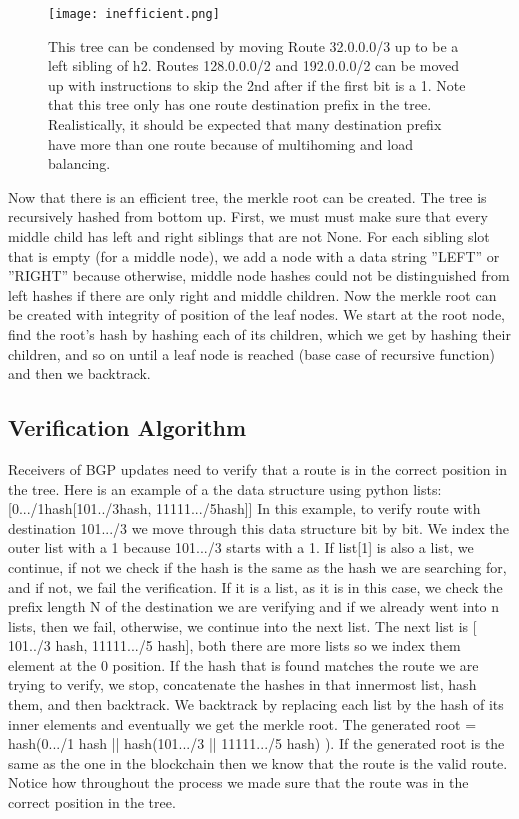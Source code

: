 \documentclass[letterpaper, 10 pt, conference]{ieeeconf}  %
\begin{document}
\begin{figure}[!ht]
	\centering
	\texttt{[image: inefficient.png]}
    \caption{This tree can be condensed by moving Route 32.0.0.0/3 up to be a left sibling of h2. Routes 128.0.0.0/2 and 192.0.0.0/2 can be moved up with instructions to skip the 2nd after if the first bit is a 1. Note that this tree only has one route destination prefix in the tree. Realistically, it should be expected that many destination prefix have more than one route because of multihoming and load balancing.}
    \end{figure}

Now that there is an efficient tree, the merkle root can be created. The tree is recursively hashed from bottom up. First, we must must make sure that every middle child has left and right siblings that are not None. For each sibling slot that is empty (for a middle node), we add a node with a data string ”LEFT” or ”RIGHT” because otherwise, middle node hashes could not be distinguished from left hashes if there are only right and middle children. Now the merkle root can be created with integrity of position of the leaf nodes. We start at the root node, find the root’s hash by hashing each of its children, which we get by hashing their children, and so on until a leaf node is reached (base case of recursive function) and then we backtrack. 

\subsection{Verification Algorithm}

Receivers of BGP updates need to verify that a route is in the correct position in the tree. Here is an example of a the data structure using python lists: [0.../1hash[101../3hash, 11111.../5hash]] In this example, to verify route with destination 101.../3 we move through this data structure bit by bit. We index the outer list with a 1 because 101.../3 starts with a 1. If list[1] is also a list, we continue, if not we check if the hash is the same as the hash we are searching for, and if not, we fail the verification. If it is a list, as it is in this case, we check the prefix length N of the destination we are verifying and if we already went into n lists, then we fail, otherwise, we continue into the next list. The next list is [ 101../3 hash, 11111.../5 hash], both there are more lists so we index them element at the 0 position. If the hash that is found matches the route we are trying to verify, we stop, concatenate the hashes in that innermost list, hash them, and then backtrack. We backtrack by replacing each list by the hash of its inner elements and eventually we get the merkle root. The generated root = hash(0.../1 hash || hash(101.../3 || 11111.../5 hash) ). If the generated root is the same as the one in the blockchain then we know that the route is the valid route. Notice how throughout the process we made sure that the route was in the correct position in the tree.
\end{document}
